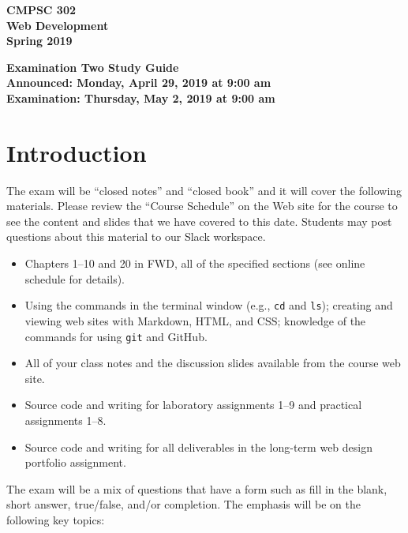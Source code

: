 \documentclass[11pt]{article}
\newcommand{\assignmentduedate}{May 2}
\newcommand{\assignmentassignedate}{April 29}
\newcommand{\assignmentnumber}{Two}
\newcommand{\labyear}{2019}
\newcommand{\assignedday}{Monday}
\newcommand{\dueday}{Thursday}
\newcommand{\labtime}{9:00 am}
\newcommand{\assigneddate}{Announced: \assignedday, \assignmentassignedate, \labyear{} at \labtime{}}
\newcommand{\duedate}{Examination: \dueday, \assignmentduedate, \labyear{} at \labtime{}}
\newcommand{\program}[1]{\lstinline{#1}}
\newcommand{\guidetitle}[1]
{
  \begin{center}
    \begin{center}
      \bf
      CMPSC 302\\Web Development\\
      Spring 2019\\
      \medskip
    \end{center}
    \bf
    #1
  \end{center}
}
\begin{document}
\thispagestyle{empty}

\guidetitle{Examination \assignmentnumber{} Study Guide \\ \assigneddate{} \\ \duedate{}}

\section*{Introduction}

\noindent
The exam will be ``closed notes'' and ``closed book'' and it will cover the
following materials. Please review the ``Course Schedule'' on the Web site for
the course to see the content and slides that we have covered to this date.
Students may post questions about this material to our Slack workspace.

\begin{itemize}

  \itemsep 0.1in

  \item Chapters 1--10 and 20 in FWD, all of the specified sections (see
    online schedule for details).

  \item Using the commands in the terminal window (e.g., \program{cd} and
    \program{ls}); creating and viewing web sites with Markdown, HTML, and CSS;
    knowledge of the commands for using \program{git} and GitHub.

  \item All of your class notes and the discussion slides available from the
    course web site.

  \item Source code and writing for laboratory assignments 1--9 and practical
    assignments 1--8.

  \item Source code and writing for all deliverables in the long-term web design
    portfolio assignment.

\end{itemize}

\noindent The exam will be a mix of questions that have a form such as fill in
the blank, short answer, true/false, and/or completion. The emphasis will be on
the following key topics:
\end{document}
